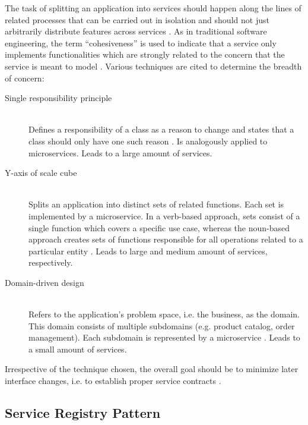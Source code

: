 The task of splitting an application into services should happen along the lines of related processes that can be carried out in isolation and should not just arbitrarily distribute features across services \cite[p.~61]{taibi2018definition}. As in traditional software engineering, the term \enquote{cohesiveness} is used to indicate that a service only implements functionalities which are strongly related to the concern that the service is meant to model \cite[p.~2]{dragoni2017microservices}. Various techniques are cited to determine the breadth of concern:

\begin{description}
  \item[Single responsibility principle]
  \hfill \\
  Defines a responsibility of a class as a reason to change and states that a class should only have one such reason \cite[p.~36]{messina2016simplified} \cite[p.~116]{thones2015microservices}. Is analogously applied to microservices. Leads to a large amount of services.

  \item[Y-axis of \gls{scale cube}]
  \hfill \\
  Splits an application into distinct sets of related functions. Each set is implemented by a microservice. In a verb-based approach, sets consist of a single function which covers a specific use case, whereas the noun-based approach creates sets of functions responsible for all operations related to a particular entity \cite[p.~36]{messina2016simplified}. Leads to large and medium amount of services, respectively.

  \item[Domain-driven design]
  \hfill \\
  Refers to the application's problem space, i.e. the business, as the domain. This domain consists of multiple subdomains (e.g. product catalog, order management). Each subdomain is represented by a microservice \cite[p.~3]{balalaie2016microservices}. Leads to a small amount of services.
\end{description}

Irrespective of the technique chosen, the overall goal should be to minimize later interface changes, i.e. to establish proper service contracts \cite[p.~26]{dmitry2014micro}.


\subsection{Service Registry Pattern}
\label{sec:service-registry-pattern}

